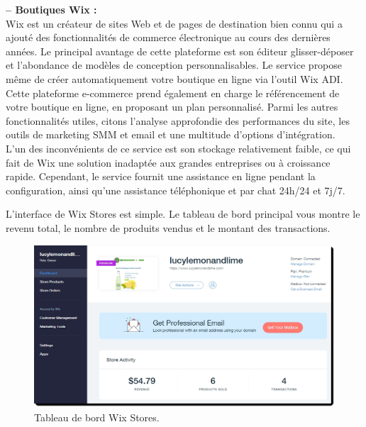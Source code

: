 \documentclass[a4paper, 12pt]{report}
\begin{document}
\textbf{-- Boutiques Wix :}\\
Wix est un créateur de sites Web et de pages de destination bien connu qui a ajouté des fonctionnalités de commerce électronique au cours des dernières années. Le principal avantage de cette plateforme est son éditeur glisser-déposer et l'abondance de modèles de conception personnalisables. Le service propose même de créer automatiquement votre boutique en ligne via l'outil Wix ADI.\\
Cette plateforme e-commerce prend également en charge le référencement de votre boutique en ligne, en proposant un plan personnalisé. Parmi les autres fonctionnalités utiles, citons l'analyse approfondie des performances du site, les outils de marketing SMM et email et une multitude d'options d'intégration.\\
L'un des inconvénients de ce service est son stockage relativement faible, ce qui fait de Wix une solution inadaptée aux grandes entreprises ou à croissance rapide. Cependant, le service fournit une assistance en ligne pendant la configuration, ainsi qu'une assistance téléphonique et par chat 24h/24 et 7j/7.

L'interface de Wix Stores est simple. Le tableau de bord principal vous montre le revenu total, le nombre de produits vendus et le montant des transactions.
\begin{figure}[H]
    \centering
    \includegraphics[width = 1\linewidth]{img/ecommerce-platform-wix_stores.png}
    \caption{Tableau de bord Wix Stores.}
\end{figure}
\end{document}
